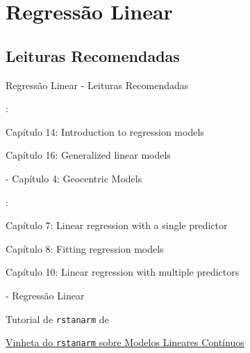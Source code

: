 \section{Regressão Linear}

\subsection{Leituras Recomendadas}
\begin{frame}{Regressão Linear - Leituras Recomendadas}
    \begin{vfilleditems}
        \item \textcite{gelman2013bayesian}:
        \begin{vfilleditems}
            \item Capítulo 14: Introduction to regression models
            \item Capítulo 16: Generalized linear models
        \end{vfilleditems}
        \item \textcite{mcelreath2020statistical} - Capítulo 4: Geocentric Models
        \item \textcite{gelman2020regression}:
        \begin{vfilleditems}
            \item Capítulo 7: Linear regression with a single predictor
            \item Capítulo 8: Fitting regression models
            \item Capítulo 10: Linear regression with multiple predictors
        \end{vfilleditems}
        \item \textcite{storopoli2021estatisticabayesianaR} - Regressão Linear
        \item Tutorial de \texttt{rstanarm} de \textcite{muth2018user}
        \item \href{http://mc-stan.org/rstanarm/articles/continuous.html}{Vinheta do \texttt{rstanarm} sobre Modelos Lineares Contínuos}
    \end{vfilleditems}
\end{frame}

